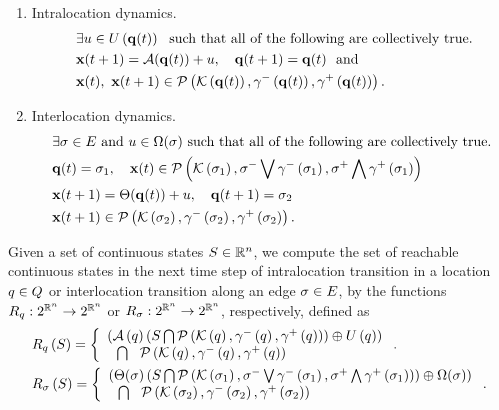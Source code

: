 \begin{enumerate}
\item Intralocation dynamics.
\begin{align}~\label{eqn:intralocation}
\begin{split}
& \exists u\in U\left({\bf q}(t)\right)~~\text{such that all of
    the following  are collectively true.}\\
& {\bf x}(t+1) = \mathcal{A}({\bf q}(t))+u,~~~{\bf q}(t+1) = {\bf q}(t)~~
\text{and}\\
& {\bf x}(t),~{\bf x}(t+1)\in\mathcal{P}\left(\mathcal{K}\left({\bf q}(t)\right),\gamma^-\left({\bf q}(t)\right),\gamma^+\left({\bf q}(t)\right)\right).
\end{split}
\end{align}
\item Interlocation dynamics.
\begin{align} 
\begin{split}
& \exists \sigma\in E~\text{and}~u\in\Omega(\sigma)~\text{such
that all of the following are collectively true.}\\
& {\bf q}(t)=\sigma_{1},~~~{\bf x}(t)\in\mathcal{P}\left(\mathcal{K}\left(\sigma_{1}\right),\sigma^-\bigvee\gamma^-\left(\sigma_{1}\right),\sigma^+\bigwedge\gamma^+\left(\sigma_{1}\right)\right) \\
& {\bf x}(t+1) = \Theta({\bf q}(t))+u,~~~{\bf q}(t+1)
= \sigma_{2}\\
& {\bf x}(t+1)\in \mathcal{P}\left(\mathcal{K}\left(\sigma_{2}\right),\gamma^-\left(\sigma_{2}\right),\gamma^+\left(\sigma_{2}\right)\right).
\end{split}
\end{align}
\end{enumerate}

Given a set of continuous states $S\in\mathbb{R}^n$, we compute the set
of reachable continuous states in the next time step of intralocation transition
in a location $q\in Q$ or interlocation transition along
an edge $\sigma\in E$, by the functions
$R_{q}:2^{\mathbb{R}^n}\rightarrow 2^{\mathbb{R}^n}$ or
$R_{\sigma}:2^{\mathbb{R}^n}\rightarrow 2^{\mathbb{R}^n}$,
respectively, defined as
\begin{align*}
&R_{q}\left(S\right) = \left\{\begin{array}{l}{\left(\mathcal{A}\left(q\right)\left(S\bigcap\mathcal{P}\left(\mathcal{K}\left(q\right),\gamma^-\left(q\right),\gamma^+\left(q\right)\right)\right)\oplus
U\left(q\right)\right)}\\{~~\bigcap~~\mathcal{P}\left(\mathcal{K}\left(q\right),\gamma^-\left(q\right),\gamma^+\left(q\right)\right)} \end{array}\right..\\
&R_{\sigma}\left(S\right) =  \left\{\begin{array}{l}{\left(\Theta(\sigma)\left(S\bigcap
\mathcal{P}\left(\mathcal{K}\left(\sigma_{1}\right),\sigma^-\bigvee\gamma^-\left(\sigma_{1}\right),\sigma^+\bigwedge\gamma^+\left(\sigma_{1}\right)\right)\right)\oplus\Omega(\sigma)\right)}\\{~~\bigcap~~\mathcal{P}\left(\mathcal{K}\left(\sigma_{2}\right),\gamma^-\left(\sigma_{2}\right),\gamma^+\left(\sigma_{2}\right)\right)} \end{array}\right..
\end{align*}

